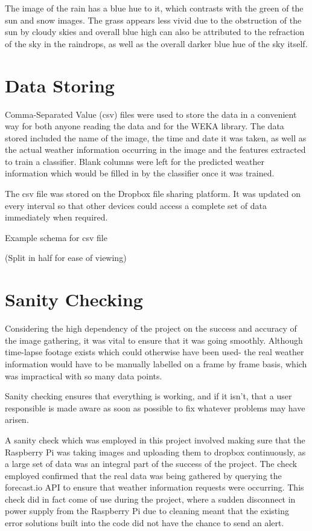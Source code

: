 \documentclass[a4paper,12pt,twoside]{report}
\begin{document}
The image of the rain has a blue hue to it, which contrasts with the green of the sun and snow images. The grass appears less vivid due to the obstruction of the sun by cloudy skies and  overall blue high can also be attributed to the refraction of the sky in the raindrops, as well as the overall darker blue hue of the sky itself. 

\section{Data Storing}
\label{sec:datastoring}
Comma-Separated Value (csv) files were used to store the data in a convenient way for both anyone reading the data and for the WEKA library. The data stored included the name of the image, the time and date it was taken, as well as the actual weather information occurring in the image and the features extracted to train a classifier. Blank columns were left for the predicted weather information which would be filled in by the classifier once it was trained.

The csv file was stored on the Dropbox file sharing platform. It was updated on every interval so that other devices could access a complete set of data immediately when required.

\begin{table}[H]
  \centering
  
  \caption{Example schema for csv file}
  (Split in half for ease of viewing)
\end{table}
 
\section{Sanity Checking}
Considering the high dependency of the project on the success and accuracy of the image gathering, it was vital to ensure that it was going smoothly. Although time-lapse footage exists which could otherwise have been used- the real weather information would have to be manually labelled on a frame by frame basis, which was impractical with so many data points.

Sanity checking ensures that everything is working, and if it isn't, that a user responsible is made aware as soon as possible to fix whatever problems may have arisen.

A sanity check which was employed in this project involved making sure that the Raspberry Pi was taking images and uploading them to dropbox continuously, as a large set of data was an integral part of the success of the project. The check employed confirmed that the real data was being gathered by querying the forecast.io API to ensure that weather information requests were occurring. This check did in fact come of use during the project, where a sudden disconnect in power supply from the Raspberry Pi due to cleaning meant that the existing error solutions built into the code did not have the chance to send an alert.
\end{document}
